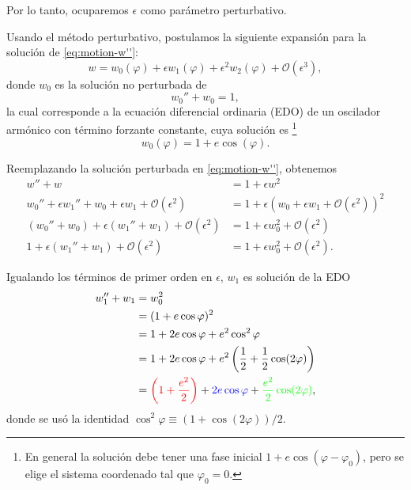 \documentclass[letterpaper,11pt]{article}
\begin{document}
Por lo tanto, ocuparemos $\epsilon$ como parámetro perturbativo. 

Usando el método perturbativo, postulamos la siguiente expansión para la solución de \eqref{eq:motion-w''}:
\begin{equation}
w = w_0(\varphi) + \epsilon w_1(\varphi) + \epsilon^2 w_2(\varphi) + \mathcal{O}(\epsilon^3),
\end{equation}
donde $w_0$ es la solución no perturbada de
\begin{equation}
w_0'' + w_0 = 1,
\end{equation}
la cual corresponde a la ecuación diferencial ordinaria (EDO) de un oscilador armónico con término forzante constante, cuya solución es \footnote{En general la solución debe tener una fase inicial $ 1 + e \cos(\varphi - \varphi_0)$, pero se elige el sistema coordenado tal que $\varphi_0 = 0$.}
\begin{equation}
w_0(\varphi) = 1 + e \cos(\varphi).
\end{equation}

Reemplazando la solución perturbada en \eqref{eq:motion-w''}, obtenemos 
\begin{align}
w'' + w &= 1 + \epsilon w^2 \\
w_0'' + \epsilon w_1'' + w_0 + \epsilon w_1 + \mathcal{O}(\epsilon^2) &= 1 + \epsilon \left( w_0 + \epsilon w_1 + \mathcal{O}(\epsilon^2)\right)^2 \\
(w_0'' + w_0) + \epsilon (w_1'' + w_1)+ \mathcal{O}(\epsilon^2) &= 1 + \epsilon w_0^2 + \mathcal{O}(\epsilon^2) \\
1 + \epsilon(w_1'' + w_1)+ \mathcal{O}(\epsilon^2) &= 1 + \epsilon w_0^2 + \mathcal{O}(\epsilon^2).
\end{align}

Igualando los términos de primer orden en $\epsilon$, $w_1$ es solución de la EDO
\begin{align}
w_1'' + w_1 &= w_0^2 \nonumber \\
&= (1 + e\cos\varphi)^2  \nonumber\\
&= 1 + 2e \cos\varphi + e^2 \cos^2\varphi  \nonumber\\
&= 1 + 2e \cos\varphi + e^2 \left( \frac{1}{2} + \frac{1}{2} \cos(2\varphi) \right) \nonumber \\
&= \textcolor{red}{\left( 1 + \frac{e^2}{2}\right)} + \textcolor{blue}{2 e\cos\varphi} + \textcolor{green}{\frac{e^2}{2} \cos(2\varphi)}, \label{eq:EDO-w1}
\end{align}
donde se usó la identidad $\cos^2\varphi \equiv (1 + \cos(2\varphi))/2$.
\end{document}
